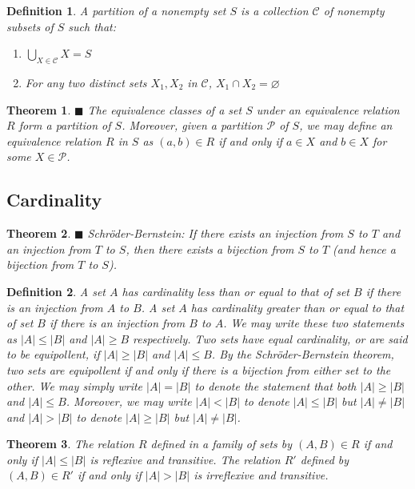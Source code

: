 \documentclass[a4paper]{article}
\newtheorem{mytheorem}{Theorem}
\newtheorem{mydef}{Definition}
\numberwithin{mytheorem}{section}
\numberwithin{mydef}{section}
\numberwithin{axiom}{section}
\numberwithin{example}{section}
\newcommand{\done}{$\blacksquare$ }
\begin{document}
\begin{mydef}A partition of a nonempty set $S$ is a collection $\mathcal{C}$ of nonempty subsets of $S$ such that:
 \begin{enumerate}
 \item $\bigcup\limits_{X \in \mathcal{C}} X = S$
  \item For any two distinct sets $X_{1},X_{2}$ in $\mathcal{C}$, $X_{1} \cap X_{2} = \varnothing $
 \end{enumerate}
\end{mydef}

\begin{mytheorem} \done The equivalence classes of a set $S$ under an equivalence relation $R$ form a partition of $S$. Moreover, given a partition $\mathcal{P}$ of $S$, we may define an equivalence relation $R$ in $S$ as $(a,b) \in R$ if and only if $a \in X$ and $b \in X$ for some $X \in \mathcal{P}$. 
\end{mytheorem}

\subsection{Cardinality}


\begin{mytheorem} \done Schr{\"o}der-Bernstein: If there exists an injection from $S$ to $T$ and an injection from $T$ to $S$, then there exists a bijection from $S$ to $T$ (and hence a bijection from $T$ to $S$). \end{mytheorem}

\begin{mydef} A set $A$ has cardinality less than or equal to that of set $B$ if there is an injection from $A$ to $B$. A set $A$ has cardinality greater than or equal to that of set $B$ if there is an injection from $B$ to $A$. We may write these two statements as $|A| \leq |B|$ and $|A| \geq B$ respectively. Two sets have equal cardinality, or are said to be equipollent, if $|A| \geq |B|$ and $|A| \leq B$. By the Schr{\"o}der-Bernstein theorem, two sets are equipollent if and only if there is a bijection from either set to the other. We may simply write $|A| = |B|$ to denote the statement that both $|A| \geq |B|$ and $|A| \leq B$. Moreover, we may write $|A| < |B|$ to denote $|A| \leq |B|$ but $|A| \neq |B|$ and $|A| > |B|$ to denote $|A| \geq |B|$ but $|A| \neq |B|$.
\end{mydef}

\begin{mytheorem} The relation $R$ defined in a family of sets by $(A,B) \in R$ if and only if $|A| \leq |B|$ is reflexive and transitive. The relation $R'$ defined by $(A,B) \in R'$ if and only if $|A| > |B|$ is irreflexive and transitive.
\end{mytheorem}
\end{document}
